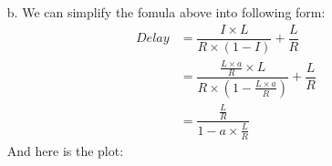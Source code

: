 \documentclass[]{article}
\begin{document}
\begin{enumerate}
\begin{enumerate}
		\item[b.] We can simplify the fomula above into following form:
		\begin{equation}
			\begin{split}
				Delay & = \dfrac{I \times L}{R \times (1 - I)} + \dfrac{L}{R} \\ & = \dfrac{\frac{L \times a}{R} \times L}{R \times (1 - \frac{L \times a}{R})} + \dfrac{L}{R} \\ & = \dfrac{\frac{L}{R}}{1 - a \times \frac{L}{R}}
			\end{split}
		\end{equation}
		And here is the plot:
		\begin{center}
		\end{center}
	\end{enumerate}
\end{enumerate}
\end{document}
